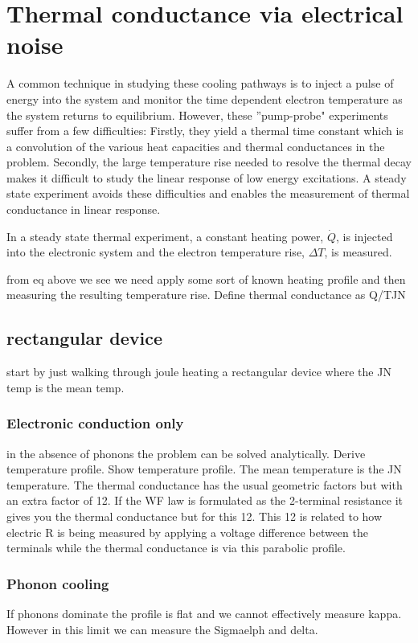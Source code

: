 \chapter{Thermal conductance via electrical noise}
\label{ch:thermal_conductance_via_electrical_noise}
A common technique in studying these cooling pathways is to inject a pulse of energy into the system and monitor the time dependent electron temperature as the system returns to equilibrium. However, these ''pump-probe" experiments suffer from a few difficulties: Firstly, they yield a thermal time constant which is a convolution of the various heat capacities and thermal conductances in the problem. Secondly, the large temperature rise needed to resolve the thermal decay makes it difficult to study the linear response of low energy excitations. A steady state experiment avoids these difficulties and enables the measurement of thermal conductance in linear response.

In a steady state thermal experiment, a constant heating power, $\dot{Q}$, is injected into the electronic system and the electron temperature rise, $\Delta T$, is measured.


from eq above we see we need apply some sort of known heating profile and then measuring the resulting temperature rise. Define thermal conductance as Q/TJN

\section{rectangular device}
start by just walking through joule heating a rectangular device where the JN temp is the mean temp.

\subsection{Electronic conduction only}
in the absence of phonons the problem can be solved analytically. Derive temperature profile. Show temperature profile. The mean temperature is the JN temperature. The thermal conductance has the usual geometric factors but with an extra factor of 12. If the WF law is formulated as the 2-terminal resistance it gives you the thermal conductance but for this 12. This 12 is related to how electric R is being measured by applying a voltage difference between the terminals while the thermal conductance is via this parabolic profile.

\subsection{Phonon cooling}
If phonons dominate the profile is flat and we cannot effectively measure kappa. However in this limit we can measure the Sigmaelph and delta.


